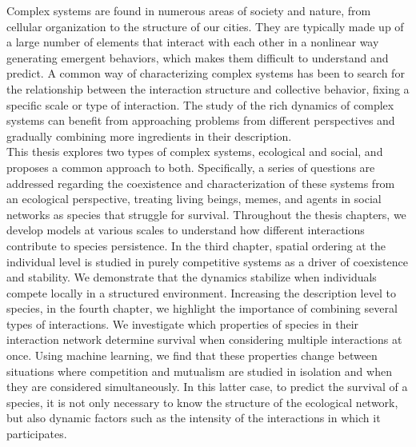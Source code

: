 Complex systems are found in numerous areas of society and nature, from cellular organization to the structure of our cities. They are typically made up of a large number of elements that interact with each other in a nonlinear way generating emergent behaviors, which makes them difficult to understand and predict. A common way of characterizing complex systems has been to search for the relationship between the interaction structure and collective behavior, fixing a specific scale or type of interaction. The study of the rich dynamics of complex systems can benefit from approaching problems from different perspectives and gradually combining more ingredients in their description.\\

This thesis explores two types of complex systems, ecological and social, and proposes a common approach to both. Specifically, a series of questions are addressed regarding the coexistence and characterization of these systems from an ecological perspective, treating living beings, memes, and agents in social networks as species that struggle for survival. Throughout the thesis chapters, we develop models at various scales to understand how different interactions contribute to species persistence. In the third chapter, spatial ordering at the individual level is studied in purely competitive systems as a driver of coexistence and stability. We demonstrate that the dynamics stabilize when individuals compete locally in a structured environment. Increasing the description level to species, in the fourth chapter, we highlight the importance of combining several types of interactions. We investigate which properties of species in their interaction network determine survival when considering multiple interactions at once. Using machine learning, we find that these properties change between situations where competition and mutualism are studied in isolation and when they are considered simultaneously. In this latter case, to predict the survival of a species, it is not only necessary to know the structure of the ecological network, but also dynamic factors such as the intensity of the interactions in which it participates.\\

